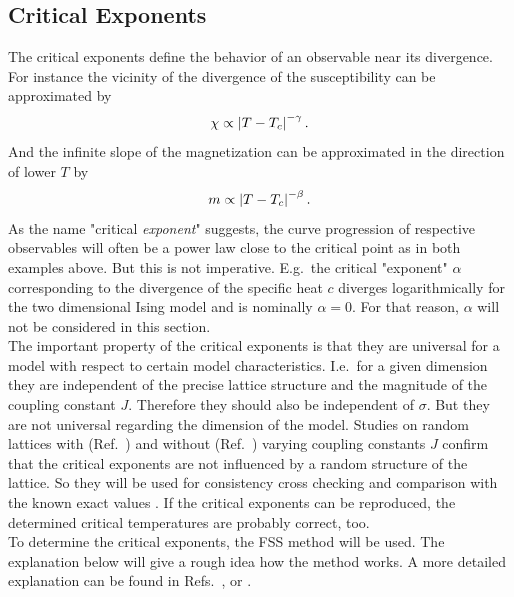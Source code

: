 \subsection{Critical Exponents}
\label{ssec:critExp}
    The critical exponents define the behavior of an observable near its
    divergence. For instance the vicinity of the divergence of the susceptibility
    can be approximated by
    \begin{equation}
        \chi \propto \left\vert T-T_{c}\right\vert^{-\gamma}.
        \label{eq:critExp:gamma}
    \end{equation}
    And the infinite slope of the magnetization can be approximated in
    the direction of lower \(T\) by
    \begin{equation}
        m \propto \left\vert T-T_{c}\right\vert^{-\beta}.
        \label{eq:critExp:beta}
    \end{equation}
    As the name "critical \emph{exponent}" suggests, the curve progression
    of respective observables will often be a power law close to the critical
    point as in both examples above. But this is not imperative.
    E.g.\ the critical "exponent" \(\alpha\) corresponding to the divergence of
    the specific heat \(c\) diverges logarithmically for the two dimensional
    Ising model and is nominally \(\alpha = 0\).
    For that reason, \(\alpha\) will not be considered in this section.\\
    The important property of the critical exponents is that they are
    universal for a model with respect to certain model characteristics.
    I.e.\ for a given dimension they are independent of the precise lattice
    structure and the magnitude of the coupling constant \(J\).
    Therefore they should also be independent of \(\sigma\). But they are
    not universal regarding the dimension of the model.
    Studies on random lattices with (Ref.\ \cite{Lima2000}) and without (Ref.\ \cite{Janke1994})
    varying coupling constants \(J\) confirm that the
    critical exponents are not influenced by a random structure of the lattice.
    So they will be used for consistency cross checking and
    comparison with the known exact values \cite[p. 59]{Pelissetto2002}.
    If the critical exponents can be reproduced, the determined critical
    temperatures are probably correct, too.\\
    To determine the critical exponents, the FSS method
    will be used. The explanation below will give a rough idea how
    the method works. A more detailed explanation can be found in Refs.\ \cite{Norrenbrock2011}, \cite{DMelchert2009} or \cite{Binder2010}.
